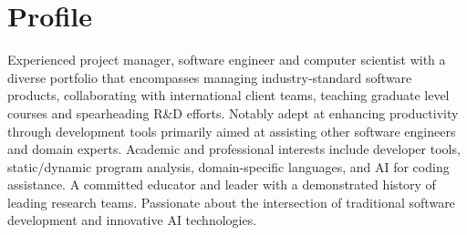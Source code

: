 \documentclass[12pt,a4paper,sans]{moderncv}
\begin{document}
\pagestyle{empty}
\makecvtitle

\section{Profile}

Experienced project manager, software engineer and computer scientist with a diverse portfolio that encompasses managing industry-standard software products, collaborating with international client teams, teaching graduate level courses and spearheading R\&D efforts. Notably adept at enhancing productivity through development tools primarily aimed at assisting other software engineers and domain experts. Academic and professional interests include developer tools, static/dynamic program analysis, domain-specific languages, and AI for coding assistance. A committed educator and leader with a demonstrated history of leading research teams. Passionate about the intersection of traditional software development and innovative AI technologies.
\end{document}
